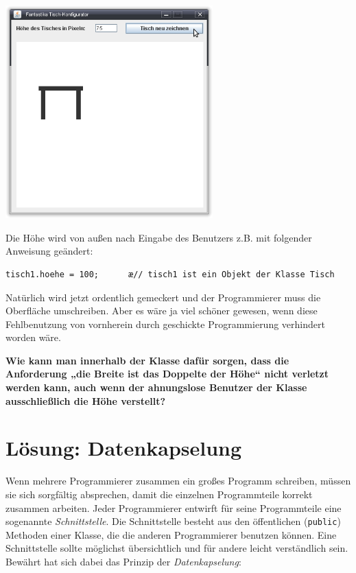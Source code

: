 \begin{center}
\includegraphics[width=0.6\textwidth]{./inf/SEKII/12_Java_Datenkapselung/tisch-konfigurator.png}
\end{center}

Die Höhe wird von außen nach Eingabe des Benutzers z.B. mit folgender Anweisung
geändert:

\begin{lstlisting}
tisch1.hoehe = 100;      æ// tisch1 ist ein Objekt der Klasse Tisch
\end{lstlisting}

Natürlich wird jetzt ordentlich gemeckert und der Programmierer muss die
Oberfläche umschreiben. Aber es wäre ja viel schöner gewesen, wenn diese
Fehlbenutzung von vornherein durch geschickte Programmierung verhindert worden
wäre.

\textbf{Wie kann man innerhalb der Klasse  dafür sorgen, dass
die Anforderung „die Breite ist das Doppelte der Höhe“ nicht verletzt werden kann,
auch wenn der ahnungslose Benutzer der Klasse ausschließlich die Höhe
verstellt?}


\section{Lösung: Datenkapselung}

Wenn mehrere Programmierer zusammen ein großes Programm schreiben,
müssen sie sich sorgfältig absprechen, damit die einzelnen Programmteile
korrekt zusammen arbeiten. Jeder Programmierer entwirft für seine
Programmteile eine sogenannte \emph{Schnittstelle}. Die Schnittstelle besteht
aus den öffentlichen (\lstinline|public|) Methoden einer Klasse,
die die anderen Programmierer benutzen können. Eine Schnittstelle sollte möglichst
übersichtlich und für andere leicht verständlich sein. Bewährt hat sich dabei
das Prinzip der \emph{Datenkapselung}:

